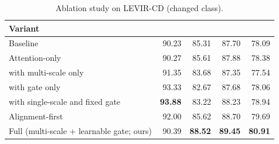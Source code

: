 \begin{table}[t]
  \centering
  \caption{Ablation study on LEVIR-CD (changed class).}
  \label{tab:ablation}
  \setlength{\tabcolsep}{6pt}
  \renewcommand{\arraystretch}{1.05}
  \small
  \begin{tabularx}{\textwidth}{X r r r r}
    \toprule
    Variant & \PrecC{} & \RecC{} & \Fonec{} & \Iouc{} \\
    \midrule
    Baseline & 90.23 & 85.31 & 87.70 & 78.09 \\
    Attention-only & 90.27 & 85.61 & 87.88 & 78.38 \\
    \cosa{} with multi-scale only & 91.35 & 83.68 & 87.35 & 77.54 \\
    \cosa{} with gate only & 93.33 & 82.67 & 87.68 & 78.06 \\
    \cosa{} with single-scale and fixed gate & \textbf{93.88} & 83.22 & 88.23 & 78.94 \\
    Alignment-first & 92.00 & 85.62 & 88.70 & 79.69 \\
    Full \cosa{} (multi-scale + learnable gate; ours) & 90.39 & \textbf{88.52} & \textbf{89.45} & \textbf{80.91} \\
    \bottomrule
  \end{tabularx}
\end{table}
